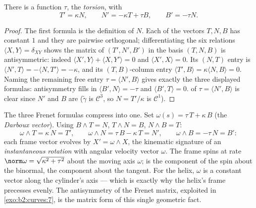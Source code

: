 \begin{theorem}\label{thm:b2:curves:frenet3d}
There is a  function $\tau$, the \emph{torsion}, with
\[
T' = \kappa N, \qquad
N' = -\kappa T + \tau B, \qquad
B' = -\tau N .
\]
\end{theorem}

\begin{proof}
The first formula is the definition of $N$. Each of the vectors
$T, N, B$ has constant  $1$ and they are pairwise orthogonal;
differentiating the six relations $\langle X, Y\rangle = \delta_{XY}$
shows the matrix of $(T', N', B')$ in the basis $(T, N, B)$ is
antisymmetric: indeed $\langle X', Y\rangle + \langle X, Y'\rangle = 0$ and
$\langle X', X\rangle = 0$. Its $(N, T)$ entry is $\langle N', T\rangle =
-\langle N, T'\rangle = -\kappa$, and its $(T, B)$-column entry
$\langle T', B\rangle = \kappa\langle N, B\rangle = 0$. Naming the remaining
free entry $\tau = \langle N', B\rangle$ gives exactly the three displayed
formulas: antisymmetry fills in $\langle B', N\rangle = -\tau$ and
$\langle B', T\rangle = 0$.  of $\tau = \langle N', B\rangle$ is clear
since $N'$ and $B$ are  ($\tilde\gamma$ is
$\mathcal{C}^3$, so $N = T'/\kappa$ is $\mathcal{C}^1$).
\end{proof}

\begin{example}\label{ex:b2:curves:darboux}
The three Frenet formulas compress into one. Set $\omega(s) =
\tau\,T + \kappa\,B$ (the \emph{Darboux vector}). Using $B
\wedge T = N$, $T \wedge N = B$, $N \wedge B = T$:
\[
\omega \wedge T = \kappa\,N = T', \qquad
\omega \wedge N = \tau\,B - \kappa\,T = N', \qquad
\omega \wedge B = -\tau\,N = B' :
\]
each frame vector evolves by $X' = \omega \wedge X$, the
kinematic signature of an \emph{instantaneous rotation} with
angular velocity vector $\omega$. The frame spins at rate
$\norm\omega = \sqrt{\kappa^2 + \tau^2}$ about the moving
axis $\omega$;  is the component of the spin about
the binormal,  the component about the tangent. For
the helix, $\omega$ is a constant vector along the cylinder's
axis --- which is exactly why the helix's frame precesses
evenly. The antisymmetry of the Frenet matrix, exploited in
\cref{exo:b2:curves:7}, is the matrix form of this single
geometric fact.
\end{example}

